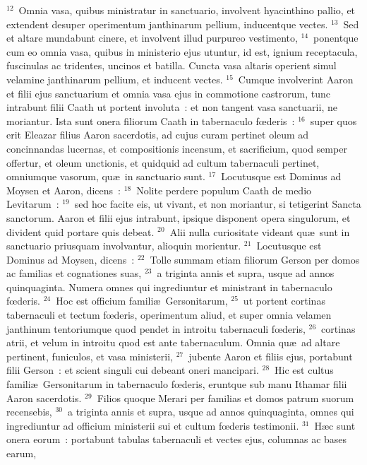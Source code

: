${}^{12}$~Omnia vasa, quibus ministratur in sanctuario, involvent hyacinthino pallio, et extendent desuper operimentum janthinarum pellium, inducentque vectes.
${}^{13}$~Sed et altare mundabunt cinere, et involvent illud purpureo vestimento,
${}^{14}$~ponentque cum eo omnia vasa, quibus in ministerio ejus utuntur, id est, ignium receptacula, fuscinulas ac tridentes, uncinos et batilla. Cuncta vasa altaris operient simul velamine janthinarum pellium, et inducent vectes.
${}^{15}$~Cumque involverint Aaron et filii ejus sanctuarium et omnia vasa ejus in commotione castrorum, tunc intrabunt filii Caath ut portent involuta~: et non tangent vasa sanctuarii, ne moriantur. Ista sunt onera filiorum Caath in tabernaculo fœderis~:
${}^{16}$~super quos erit Eleazar filius Aaron sacerdotis, ad cujus curam pertinet oleum ad concinnandas lucernas, et compositionis incensum, et sacrificium, quod semper offertur, et oleum unctionis, et quidquid ad cultum tabernaculi pertinet, omniumque vasorum, qu\ae\ in sanctuario sunt.
${}^{17}$~Locutusque est Dominus ad Moysen et Aaron, dicens~:
${}^{18}$~Nolite perdere populum Caath de medio Levitarum~:
${}^{19}$~sed hoc facite eis, ut vivant, et non moriantur, si tetigerint Sancta sanctorum. Aaron et filii ejus intrabunt, ipsique disponent opera singulorum, et divident quid portare quis debeat.
${}^{20}$~Alii nulla curiositate videant qu\ae\ sunt in sanctuario priusquam involvantur, alioquin morientur.
${}^{21}$~Locutusque est Dominus ad Moysen, dicens~:
${}^{22}$~Tolle summam etiam filiorum Gerson per domos ac familias et cognationes suas,
${}^{23}$~a triginta annis et supra, usque ad annos quinquaginta. Numera omnes qui ingrediuntur et ministrant in tabernaculo fœderis.
${}^{24}$~Hoc est officium famili\ae\ Gersonitarum,
${}^{25}$~ut portent cortinas tabernaculi et tectum fœderis, operimentum aliud, et super omnia velamen janthinum tentoriumque quod pendet in introitu tabernaculi fœderis,
${}^{26}$~cortinas atrii, et velum in introitu quod est ante tabernaculum. Omnia qu\ae\ ad altare pertinent, funiculos, et vasa ministerii,
${}^{27}$~jubente Aaron et filiis ejus, portabunt filii Gerson~: et scient singuli cui debeant oneri mancipari.
${}^{28}$~Hic est cultus famili\ae\ Gersonitarum in tabernaculo fœderis, eruntque sub manu Ithamar filii Aaron sacerdotis.
${}^{29}$~Filios quoque Merari per familias et domos patrum suorum recensebis,
${}^{30}$~a triginta annis et supra, usque ad annos quinquaginta, omnes qui ingrediuntur ad officium ministerii sui et cultum fœderis testimonii.
${}^{31}$~H\ae c sunt onera eorum~: portabunt tabulas tabernaculi et vectes ejus, columnas ac bases earum,
